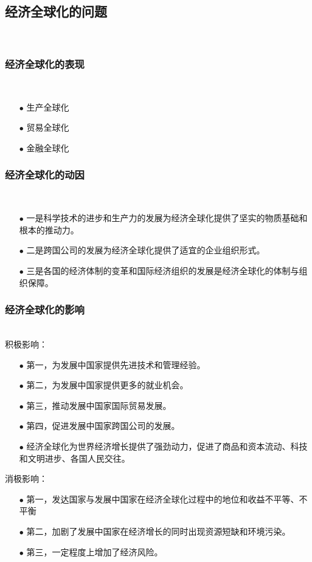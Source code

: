 \documentclass{ctexart}
\begin{document}
\subsection{经济全球化的问题}~{}
\vspace{-5mm}

\subsubsection{经济全球化的表现}~{}
\vspace{-5mm}
\begin{itemize}
\item[$\bullet$]生产全球化
\item[$\bullet$]贸易全球化
\item[$\bullet$]金融全球化
\end{itemize}

\subsubsection{经济全球化的动因}~{}
\vspace{-5mm}
\begin{itemize}
\item[$\bullet$]一是科学技术的进步和生产力的发展为经济全球化提供了坚实的物质基础和根本的推动力。
\item[$\bullet$]二是跨国公司的发展为经济全球化提供了适宜的企业组织形式。
\item[$\bullet$]三是各国的经济体制的变革和国际经济组织的发展是经济全球化的体制与组织保障。
\end{itemize}


\subsubsection{经济全球化的影响}~{}
\vspace{-5mm}
\\
积极影响：
\begin{itemize}
\item[$\bullet$]第一，为发展中国家提供先进技术和管理经验。
\item[$\bullet$]第二，为发展中国家提供更多的就业机会。
\item[$\bullet$]第三，推动发展中国家国际贸易发展。
\item[$\bullet$]第四，促进发展中国家跨国公司的发展。
\item[$\bullet$]经济全球化为世界经济增长提供了强劲动力，促进了商品和资本流动、科技和文明进步、各国人民交往。
\end{itemize}
消极影响：
\begin{itemize}
    \item[$\bullet$]第一，发达国家与发展中国家在经济全球化过程中的地位和收益不平等、不平衡
    \item[$\bullet$]第二，加剧了发展中国家在经济增长的同时出现资源短缺和环境污染。
    \item[$\bullet$]第三，一定程度上增加了经济风险。
    \end{itemize}
\end{document}
